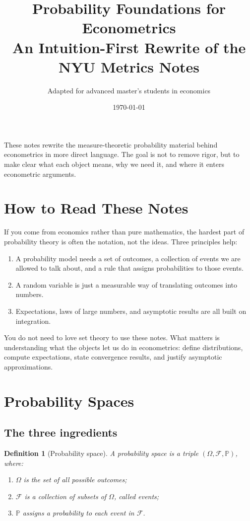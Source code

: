 \documentclass[11pt]{article}
\title{Probability Foundations for Econometrics\\\large An Intuition-First Rewrite of the NYU Metrics Notes}
\author{Adapted for advanced master's students in economics}
\date{\today}
\newtheorem{definition}{Definition}[section]
\theoremstyle{remark}
\newcommand{\PP}{\mathbb{P}}
\newcommand{\1}{\mathbbm{1}}
\newcommand{\cF}{\mathcal{F}}
\begin{document}
\maketitle

These notes rewrite the measure-theoretic probability material behind econometrics in more direct language. The goal is not to remove rigor, but to make clear what each object means, why we need it, and where it enters econometric arguments.

\tableofcontents

\section{How to Read These Notes}

If you come from economics rather than pure mathematics, the hardest part of probability theory is often the notation, not the ideas. Three principles help:

\begin{enumerate}[label=(\arabic*)]
  \item A probability model needs a set of outcomes, a collection of events we are allowed to talk about, and a rule that assigns probabilities to those events.
  \item A random variable is just a measurable way of translating outcomes into numbers.
  \item Expectations, laws of large numbers, and asymptotic results are all built on integration.
\end{enumerate}

You do not need to love set theory to use these notes. What matters is understanding what the objects let us do in econometrics: define distributions, compute expectations, state convergence results, and justify asymptotic approximations.

\section{Probability Spaces}

\subsection{The three ingredients}

\begin{definition}[Probability space]
A \emph{probability space} is a triple \((\Omega,\cF,\PP)\), where:
\begin{enumerate}[label=(\roman*)]
  \item \(\Omega\) is the set of all possible outcomes;
  \item \(\cF\) is a collection of subsets of \(\Omega\), called \emph{events};
  \item \(\PP\) assigns a probability to each event in \(\cF\).
\end{enumerate}
\end{definition}
\end{document}
